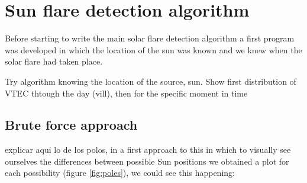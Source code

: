\chapter{Sun flare detection algorithm}

Before starting to write the main solar flare detection algorithm a first program was developed in which the location of the sun was known and we knew when the solar flare had taken place.

Try algorithm knowing the location of the source, sun. Show first distribution of VTEC thtough the day (vill), then for the specific moment in time


\section{Brute force approach}





explicar aqui lo de los polos, in a first approach to this in which to visually see ourselves the differences between possible Sun positions we obtained a plot for each possibility (figure \ref{fig:poles}), we could see this happening:

